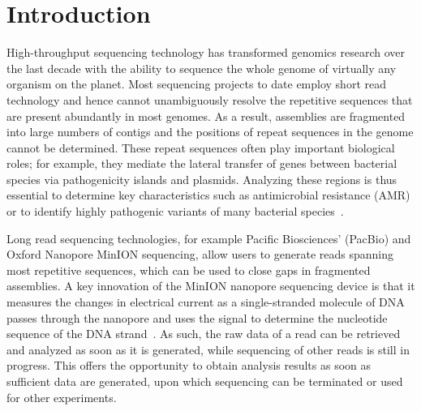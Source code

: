 \section{Introduction}

High-throughput sequencing technology has transformed genomics research over the
last decade with the ability to sequence the whole genome of virtually any
organism on the planet. Most sequencing projects to date employ short read
technology and hence cannot unambiguously resolve the repetitive sequences that
are present abundantly in most genomes. As a result, assemblies are fragmented
into large numbers of contigs and the positions of repeat sequences in the
genome cannot be determined. These repeat sequences often play important
biological roles; for example, they mediate the lateral transfer of genes
between bacterial species via pathogenicity islands and plasmids. Analyzing
these regions is thus essential to determine key characteristics such as
antimicrobial resistance (AMR) or to identify highly pathogenic variants of many
bacterial species~\cite{AshtonND2015}.

Long read sequencing technologies, for example Pacific Biosciences' (PacBio) and
Oxford Nanopore MinION sequencing, allow users to generate reads spanning most
repetitive sequences, which can be used to close gaps in fragmented assemblies.
A key innovation of the MinION nanopore sequencing device is that it
measures the changes in electrical current as a single-stranded molecule of DNA
passes through the nanopore and uses the signal to determine the nucleotide
sequence of the DNA strand~\cite{KasianowiczBB1996, BrantonDM2008, StoddartHM2009}. 
As such, the raw data of a read can be retrieved and analyzed
as soon as it is generated, while sequencing of other reads is
still in progress.
This offers the opportunity to obtain analysis results as
soon as sufficient data are generated, upon which sequencing can be terminated
or used for other experiments.

